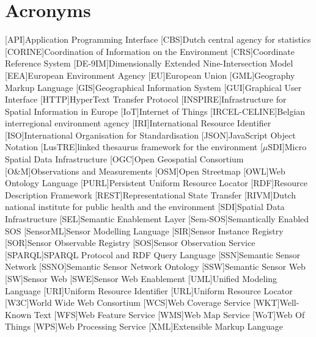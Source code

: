 \chapter*{Acronyms}

\begin{acronym}[UML]
  [API]{Application Programming Interface}
  [CBS]{Dutch central agency for statistics}
  [CORINE]{Coordination of Information on the Environment} 
  [CRS]{Coordinate Reference System} 
  [DE-9IM]{Dimensionally Extended Nine-Intersection Model}
  [EEA]{European Environment Agency}
  [EU]{European Union}
  [GML]{Geography Markup Language}
  [GIS]{Geographical Information System}
  [GUI]{Graphical User Interface}
  [HTTP]{HyperText Transfer Protocol}
  [INSPIRE]{Infrastructure for Spatial Information in Europe}
  [IoT]{Internet of Things}
  [IRCEL-CELINE]{Belgian interregional environment agency}
  [IRI]{International Resource Identifier}
  [ISO]{International Organisation for Standardisation}
  [JSON]{JavaScript Object Notation}
  [LusTRE]{linked thesaurus framework for the environment} 
  [$\mu$SDI]{Micro Spatial Data Infrastructure}
  [OGC]{Open Geospatial Consortium}
  [O\&M]{Observations and Measurements}
  [OSM]{Open Streetmap}
  [OWL]{Web Ontology Language}
  [PURL]{Persistent Uniform Resource Locator}
  [RDF]{Resource Description Framework}
  [REST]{Representational State Transfer}
  [RIVM]{Dutch national institute for public health and the environment}
  [SDI]{Spatial Data Infrastructure}
  [SEL]{Semantic Enablement Layer}
  [Sem-SOS]{Semantically Enabled SOS}
  [SensorML]{Sensor Modelling Language}
  [SIR]{Sensor Instance Registry}
  [SOR]{Sensor Observable Registry}
  [SOS]{Sensor Observation Service}
  [SPARQL]{SPARQL Protocol and RDF Query Language}
  [SSN]{Semantic Sensor Network}
  [SSNO]{Semantic Sensor Network Ontology}
  [SSW]{Semantic Sensor Web}
  [SW]{Sensor Web}
  [SWE]{Sensor Web Enablement}
  [UML]{Unified Modeling Language}
  [URI]{Uniform Resource Identifier}
  [URL]{Uniform Resource Locator}
  [W3C]{World Wide Web Consortium}
  [WCS]{Web Coverage Service}
  [WKT]{Well-Known Text}
  [WFS]{Web Feature Service}
  [WMS]{Web Map Service}
  [WoT]{Web Of Things}
  [WPS]{Web Processing Service}
  [XML]{Extensible Markup Language}
\end{acronym}